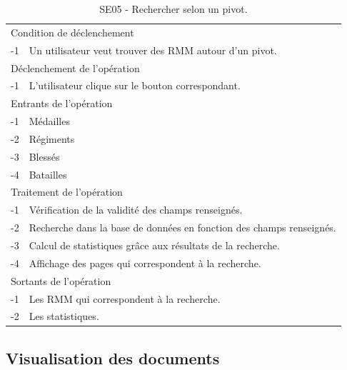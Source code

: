 \documentclass[a4paper]{article}
\begin{document}
\begin{table}[H]
  \centering
   \small
	\begin{tabular}{|c|p{12cm}|}
   		\hline
   			\rowcolor{lightgray}\multicolumn{2}{|c|}{\textbf{SE05 - Rechercher selon un pivot.}} \\
   		\hline
   			\multicolumn{2}{|l|}{Condition de d\'eclenchement} \\
   		\hline
   			-1 & Un utilisateur veut trouver des RMM autour d'un pivot. \\
   		\hline
   			\multicolumn{2}{|l|}{D\'eclenchement de l'op\'eration} \\
   		\hline
   			-1 & L'utilisateur clique sur le bouton correspondant. \\
   		\hline
   			\multicolumn{2}{|l|}{Entrants de l'op\'eration} \\
   		\hline
   			-1 & Médailles \\
            -2 & Régiments \\
            -3 & Blessés \\
            -4 & Batailles \\
   		\hline
   			\multicolumn{2}{|l|}{Traitement de l'op\'eration} \\
  		\hline
  			-1 & Vérification de la validité des champs renseignés. \\
   			-2 & Recherche dans la base de données en fonction des champs renseignés. \\
            -3 & Calcul de statistiques grâce aux résultats de la recherche. \\
        	-4 & Affichage des pages qui correspondent à la recherche. \\
   		\hline
   			\multicolumn{2}{|l|}{Sortants de l'op\'eration} \\
   		\hline
   			-1 & Les RMM qui correspondent à la recherche. \\
            -2 & Les statistiques. \\
   		\hline
	\end{tabular}
  \caption{SE05 - Rechercher selon un pivot.}
  \normalsize
  \label{tab:SE05}
\end{table}

\subsection{Visualisation des documents}
\end{document}
